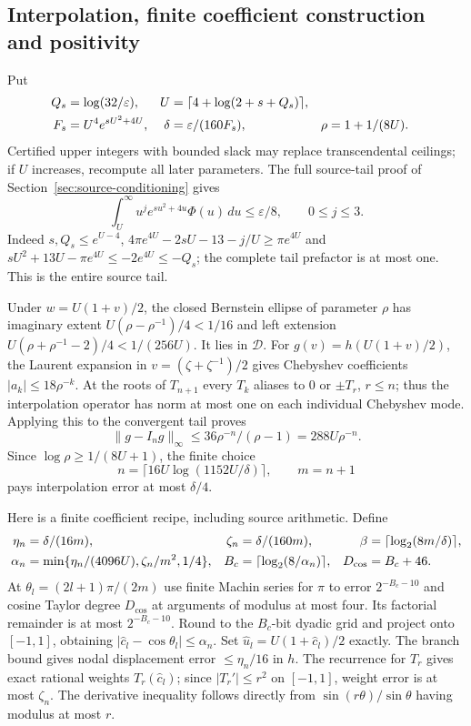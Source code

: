 \subsection{Interpolation, finite coefficient construction and positivity}
Put
\begin{align}
 Q_s&=\log(32/\varepsilon),&
 U&=\lceil4+\log(2+s+Q_s)\rceil,\notag\\
 F_s&=U^4e^{sU^2+4U},&\delta&=\varepsilon/(160F_s),&
 \rho&=1+1/(8U).
 \label{eq:ac-cutoff}
\end{align}
Certified upper integers with bounded slack may replace transcendental
ceilings; if $U$ increases, recompute all later parameters. The full
source-tail proof of Section~\ref{sec:source-conditioning} gives
\begin{equation}
 \int_U^\infty u^je^{su^2+4u}\Phi(u)\,du\le\varepsilon/8,
 \qquad 0\le j\le3.
 \label{eq:ac-full-tail}
\end{equation}
Indeed $s,Q_s\le e^{U-4}$,
$4\pi e^{4U}-2sU-13-j/U\ge\pi e^{4U}$ and
$sU^2+13U-\pi e^{4U}\le-2e^{4U}\le-Q_s$; the complete
tail prefactor is at most one. This is the entire source tail.

Under $w=U(1+v)/2$, the closed Bernstein ellipse of parameter $\rho$
has imaginary extent $U(\rho-\rho^{-1})/4<1/16$ and left
extension $U(\rho+\rho^{-1}-2)/4<1/(256U)$. It lies in
$\mathcal D$. For $g(v)=h(U(1+v)/2)$, the Laurent expansion in
$v=(\zeta+\zeta^{-1})/2$ gives Chebyshev coefficients
$|a_k|\le18\rho^{-k}$. At the roots of $T_{n+1}$ every $T_k$
aliases to $0$ or $\pm T_r$, $r\le n$; thus the interpolation
operator has norm at most one on each individual Chebyshev mode.
Applying this to the convergent tail proves
\[
 \|g-I_ng\|_\infty\le36\rho^{-n}/(\rho-1)
                         =288U\rho^{-n}.
\]
Since $\log\rho\ge1/(8U+1)$, the finite choice
\begin{equation}
 n=\lceil16U\log(1152U/\delta)\rceil,\qquad m=n+1
 \label{eq:ac-degree}
\end{equation}
pays interpolation error at most $\delta/4$.

Here is a finite coefficient recipe, including source arithmetic.
Define
\begin{align}
 \eta_n&=\delta/(16m),&\zeta_n&=\delta/(160m),&
 \beta&=\lceil\log_2(8m/\delta)\rceil,\notag\\
 \alpha_n&=\min\{\eta_n/(4096U),\zeta_n/m^2,1/4\},&
 B_c&=\lceil\log_2(8/\alpha_n)\rceil,&D_{\cos}&=B_c+46.
 \label{eq:ac-node-recipe}
\end{align}
At $\theta_l=(2l+1)\pi/(2m)$ use finite Machin series for $\pi$
to error $2^{-B_c-10}$ and cosine Taylor degree $D_{\cos}$ at
arguments of modulus at most four. Its factorial remainder is at most
$2^{-B_c-10}$. Round to the $B_c$-bit dyadic grid and project onto
$[-1,1]$, obtaining $|\widehat c_l-\cos\theta_l|\le\alpha_n$.
Set $\widehat u_l=U(1+\widehat c_l)/2$ exactly. The branch bound gives
nodal displacement error $\le\eta_n/16$ in $h$. The recurrence for
$T_r$ gives exact rational weights $T_r(\widehat c_l)$; since
$|T_r'|\le r^2$ on $[-1,1]$, weight error is at most $\zeta_n$.
The derivative inequality follows directly from
$\sin(r\theta)/\sin\theta$ having modulus at most $r$.

